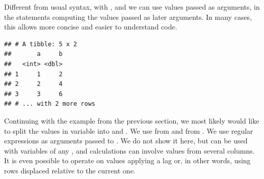 \documentclass[krantz2]{krantz}\usepackage{knitr}
\begin{document}
\begin{explainbox}
Different from usual \Rlang syntax, with ,  and  we can use values passed as arguments, in the statements computing the values passed as later arguments. In many cases, this allows more concise and easier to understand code.

\begin{knitrout}\footnotesize
{}\color{fgcolor}\begin{kframe}
\begin{alltt}
\hlstd{(} \hlstd{=} \hlopt{:}\hlstd{,}  \hlstd{=}  \hlopt{*} 
\end{alltt}
\begin{verbatim}
## # A tibble: 5 x 2
##       a     b
##   <int> <dbl>
## 1     1     2
## 2     2     4
## 3     3     6
## # ... with 2 more rows
\end{verbatim}
\end{kframe}
\end{knitrout}
\end{explainbox}

Continuing with the example from the previous section, we most likely would like to split the values in variable  into  and . We use  from  and  from . We use regular expressions as arguments passed to .  We do not show it here, but  can be used with variables of any , and calculations can involve values from several columns. It is even possible to operate on values applying a lag or, in other words, using rows displaced relative to the current one.

\begin{knitrout}\footnotesize
{}\color{fgcolor}
\end{knitrout}
\end{document}
